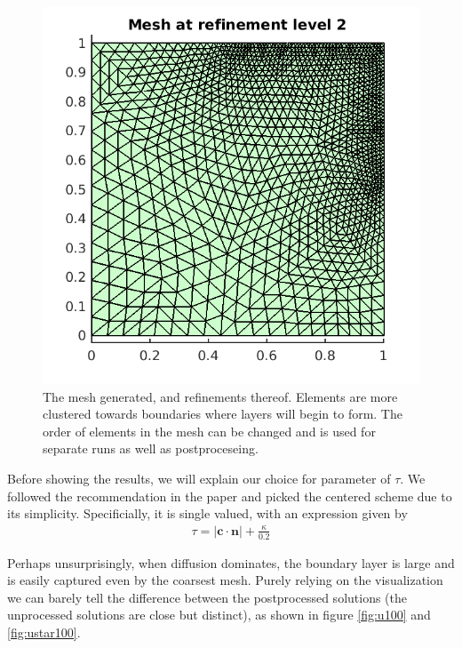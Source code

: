 \documentclass{article}
\begin{document}
\begin{figure}[!ht]
\includegraphics[scale=0.5]{um_3.png}
\caption{The mesh generated, and refinements thereof. Elements are more clustered towards boundaries where layers will begin to form. The order of elements in the mesh can be changed and is used for separate runs as well as postproceseing.}
\label{fig:um}
\end{figure}

Before showing the results, we will explain our choice for parameter of $\tau$.
We followed the recommendation in the paper \cite{nguyen} and picked the centered scheme due to its simplicity.
Specificially, it is single valued, with an expression given by
\begin{align}
\tau = |\mathbf{c} \cdot \mathbf{n}| + \frac{\kappa}{0.2}
\end{align}

Perhaps unsurprisingly, when diffusion dominates, the boundary layer is large and is easily captured even by the coarsest mesh.
Purely relying on the visualization we can barely tell the difference between the postprocessed solutions (the unprocessed solutions are close but distinct), as shown in figure \ref{fig:u100} and \ref{fig:ustar100}.
\end{document}
